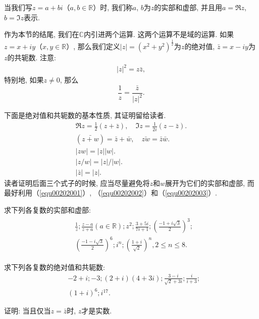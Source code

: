 当我们写$z = a + bi$（$a, b \in \mathbb{R}$）时, 我们称$a$, $b$为$z$的实部和虚部, 并且用$a = \Re{z}$, $b=\Im{z}$表示. 

作为本节的结尾, 我们在$\mathbb{C}$内引进两个运算. 这两个运算不是域的运算. 如果$z = x+iy$（$x, y \in \mathbb{R}$）, 那么我们定义$|z| = (x^2+y^2)^{\frac{1}{2}}$为$z$的绝对值, $\bar{z}=x-iy$为$z$的共轭数. 注意: 
\begin{gather}\label{equ00202001}
|z|^2=z\bar{z},
\end{gather}
特别地, 如果$z \neq 0$, 那么
\[
\frac{1}{z} = \frac{\bar{z}}{|z|^2}.
\]

下面是绝对值和共轭数的基本性质, 其证明留给读者. 
\begin{gather}
\Re{z} = \frac{1}{2}(z + \bar{z}), \quad \Im{z} = \frac{1}{2i}(z - \bar{z}). \label{equ00202002} \\
(\bar{z+w}) = \bar{z} + \bar{w}, \quad \bar{zw} = \bar{z}\bar{w}. \label{equ00202003}\\
|zw| = |z||w|. \label{equ00202004} \\
|z/w| = |z|/|w|.\label{equ00202005}\\
|\bar{z}| = |z|.\label{equ00202006}
\end{gather}
读者证明后面三个式子的时候, 应当尽量避免将$z$和$w$展开为它们的实部和虚部, 而最好利用（\ref{equ00202001}）, （\ref{equ00202002}）和（\ref{equ00202003}）. 

\begin{exercise}
求下列各复数的实部和虚部: 
\begin{gather*}
\begin{aligned}
&\frac{1}{z}; \frac{z-a}{z+a}(a \in \mathbb{R}); z^2; \frac{3+5i}{7i+1}; (\frac{-1+i\sqrt{3}}{2})^3;\\
&(\frac{-1-i\sqrt{3}}{2})^6; i^n; (\frac{1+i}{\sqrt{2}})^n, 2 \le n \le 8.
\end{aligned}
\end{gather*}
\end{exercise}

\begin{exercise}
求下列各复数的绝对值和共轭数: 
\[
\begin{aligned}
&-2+i; -3; (2+i)(4+3i);\frac{3-i}{\sqrt{2}+3i};\frac{i}{i+3}; \\
&(1+i)^6; i^{17}.
\end{aligned}
\]
\end{exercise}

\begin{exercise}
证明: 当且仅当$z=\bar{z}$时, $z$才是实数. 
\end{exercise}

